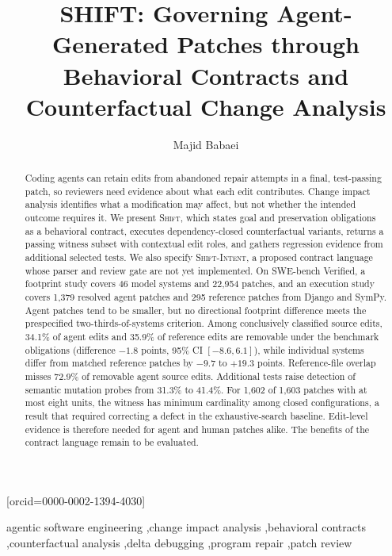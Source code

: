 \documentclass[a4paper,fleqn]{cas-sc}
\newcommand{\tool}{\textsc{Shift}}
\newcommand{\dsl}{\textsc{Shift-Intent}}
\begin{document}
\let\WriteBookmarks\relax
{}
\title[mode=title]{SHIFT: Governing Agent-Generated Patches through Behavioral Contracts and Counterfactual Change Analysis}
\author[1]{Majid Babaei}[orcid=0000-0002-1394-4030]
\cormark[1]

\begin{abstract}
Coding agents can retain edits from abandoned repair attempts in a final, test-passing patch, so reviewers need evidence about what each edit contributes. Change impact analysis identifies what a modification may affect, but not whether the intended outcome requires it. We present \tool{}, which states goal and preservation obligations as a behavioral contract, executes dependency-closed counterfactual variants, returns a passing witness subset with contextual edit roles, and gathers regression evidence from additional selected tests. We also specify \dsl{}, a proposed contract language whose parser and review gate are not yet implemented. On SWE-bench Verified, a footprint study covers 46 model systems and 22,954 patches, and an execution study covers 1,379 resolved agent patches and 295 reference patches from Django and SymPy. Agent patches tend to be smaller, but no directional footprint difference meets the prespecified two-thirds-of-systems criterion. Among conclusively classified source edits, 34.1\% of agent edits and 35.9\% of reference edits are removable under the benchmark obligations (difference $-1.8$ points, 95\% CI $[-8.6, 6.1]$), while individual systems differ from matched reference patches by $-9.7$ to $+19.3$ points. Reference-file overlap misses 72.9\% of removable agent source edits. Additional tests raise detection of semantic mutation probes from 31.3\% to 41.4\%. For 1,602 of 1,603 patches with at most eight units, the witness has minimum cardinality among closed configurations, a result that required correcting a defect in the exhaustive-search baseline. Edit-level evidence is therefore needed for agent and human patches alike. The benefits of the contract language remain to be evaluated.
\end{abstract}
\begin{keywords}
agentic software engineering \sep change impact analysis \sep behavioral contracts \sep counterfactual analysis \sep delta debugging \sep program repair \sep patch review
\end{keywords}
\maketitle
\raggedbottom
\end{document}
